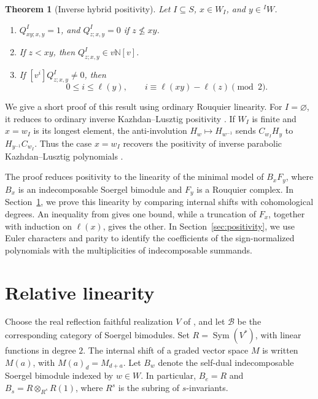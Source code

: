 \documentclass[11pt,a4paper]{article}
\numberwithin{equation}{section}
\newtheorem{theorem}{Theorem}[section]
\theoremstyle{remark}
\newcommand{\N}{\mathbb N}
\newcommand{\B}{\mathcal B}
\begin{document}
\begin{theorem}[Inverse hybrid positivity]\label{thm:positive}
Let $I\subseteq S$, $x\in W_I$, and $y\in{}^I W$.
\begin{enumerate}
 \item $Q^I_{xy;x,y}=1$, and $Q^I_{z;x,y}=0$ if $z\not\le xy$.
 \item If $z<xy$, then $Q^I_{z;x,y}\in v\N[v]$.
 \item If $[v^i]Q^I_{z;x,y}\ne0$, then
 \[
  0\le i\le\ell(y),\qquad
  i\equiv\ell(xy)-\ell(z)\pmod 2.
 \]
\end{enumerate}
\end{theorem}


We give a short proof of this result using ordinary Rouquier
linearity. For $I=\varnothing$, it reduces to ordinary inverse
Kazhdan--Lusztig positivity \cite[Remark 6.10]{EW}.
If $W_I$ is finite and $x=w_I$ is its longest element, the
anti-involution $H_w\mapsto H_{w^{-1}}$ sends $C_{w_I}H_y$ to
$H_{y^{-1}}C_{w_I}$. Thus the case $x=w_I$ recovers the
positivity of inverse parabolic Kazhdan--Lusztig polynomials
\cite[Theorem 4.15 and Remark 4.16]{P}.

The proof reduces positivity to the linearity of the minimal
model of $B_xF_y$, where $B_x$ is an indecomposable Soergel
bimodule and $F_y$ is a Rouquier complex.
In Section~\ref{sec:linearity}, we prove this linearity by
comparing internal shifts with cohomological degrees.
An inequality from \cite[Lemma 6.6]{EW} gives one bound,
while a truncation of $F_x$, together with induction on
$\ell(x)$, gives the other.
In Section~\ref{sec:positivity}, we use Euler characters
and parity to identify the coefficients of the sign-normalized
polynomials with the multiplicities of indecomposable summands.


\section{Relative linearity}\label{sec:linearity}

Choose the real reflection faithful realization $V$ of \cite[\S3.1]{EW}, and let $\B$ be the
corresponding category of Soergel bimodules. Set
$R=\operatorname{Sym}(V^*)$, with linear functions in degree $2$.
The internal shift of a graded vector space $M$ is written $M(a)$, with $M(a)_d=M_{d+a}$.
Let $B_w$ denote the self-dual indecomposable Soergel
bimodule indexed by $w\in W$. In particular, $B_e=R$ and
$B_s=R\otimes_{R^s}R(1)$, where $R^s$ is the subring of $s$-invariants.
\end{document}
